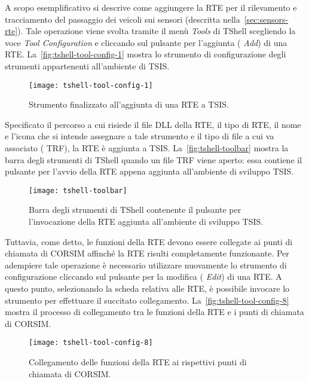 A scopo esemplificativo si descrive come aggiungere la \acs{RTE} per il rilevamento e tracciamento del passaggio dei veicoli sui sensori (descritta nella~\vref{sec:sensors-rte}). Tale operazione viene svolta tramite il menù \emph{Tools} di \acs{TShell} scegliendo la voce \emph{Tool Configuration} e cliccando sul pulsante per l'aggiunta (\ie{} \emph{Add}) di una \acs{RTE}. La~\vref{fig:tshell-tool-config-1} mostra lo strumento di configurazione degli strumenti appartenenti all'ambiente di \acs{TSIS}.

\begin{figure}[H]
\centering
\texttt{[image: tshell-tool-config-1]}
\caption[Aggiunta di una \acs{RTE} a \acs{TSIS}]{Strumento finalizzato all'aggiunta di una \acs{RTE} a \acs{TSIS}.}
\label{fig:tshell-tool-config-1}
\end{figure}
Specificato il percorso a cui risiede il file \acs{DLL} della \acs{RTE}, il tipo di \acs{RTE}, il nome e l'icona che si intende assegnare a tale strumento e il tipo di file a cui va associato (\eg{} \acs{TRF}), la \acs{RTE} è aggiunta a \acs{TSIS}. La~\vref{fig:tshell-toolbar} mostra la barra degli strumenti di \acs{TShell} quando un file \acs{TRF} viene aperto: essa contiene il pulsante per l'avvio della \acs{RTE} appena aggiunta all'ambiente di sviluppo \acs{TSIS}.
\begin{figure}[H]
\centering
\texttt{[image: tshell-toolbar]}
\caption[Barra degli strumenti di \acs{TShell}]{Barra degli strumenti di \acs{TShell} contenente il pulsante per l'invocazione della \acs{RTE} aggiunta all'ambiente di sviluppo \acs{TSIS}.}
\label{fig:tshell-toolbar}
\end{figure}

Tuttavia, come detto, le funzioni della \acs{RTE} devono essere collegate ai punti di chiamata di \acs{CORSIM} affinché la \acs{RTE} risulti completamente funzionante. Per adempiere tale operazione è necessario utilizzare nuovamente lo strumento di configurazione cliccando sul pulsante per la modifica (\ie{} \emph{Edit}) di una \acs{RTE}. A questo punto, selezionando la scheda relativa alle \acs{RTE}, è possibile invocare lo strumento per effettuare il succitato collegamento. La~\vref{fig:tshell-tool-config-8} mostra il processo di collegamento tra le funzioni della \acs{RTE} e i punti di chiamata di \acs{CORSIM}.
\begin{figure}[H]
\centering
\texttt{[image: tshell-tool-config-8]}
\caption[Collegamento delle funzioni della \acs{RTE} a \acs{CORSIM}]{Collegamento delle funzioni della \acs{RTE} ai rispettivi punti di chiamata di \acs{CORSIM}.}
\label{fig:tshell-tool-config-8}
\end{figure}

